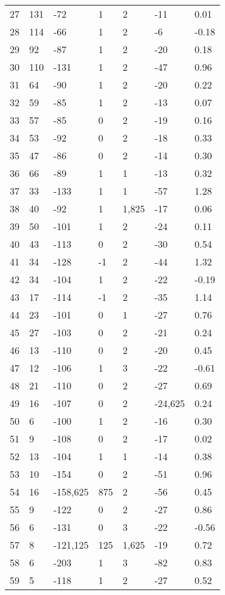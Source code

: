 \begin{appendices}
\begin{longtable}[c]{@{}lllllll@{}}
27 & 131 & -72 & 1 & 2 & -11 & 0.01 \\
28 & 114 & -66 & 1 & 2 & -6 & -0.18 \\
29 & 92 & -87 & 1 & 2 & -20 & 0.18 \\
30 & 110 & -131 & 1 & 2 & -47 & 0.96 \\
31 & 64 & -90 & 1 & 2 & -20 & 0.22 \\
32 & 59 & -85 & 1 & 2 & -13 & 0.07 \\
33 & 57 & -85 & 0 & 2 & -19 & 0.16 \\
34 & 53 & -92 & 0 & 2 & -18 & 0.33 \\
35 & 47 & -86 & 0 & 2 & -14 & 0.30 \\
36 & 66 & -89 & 1 & 1 & -13 & 0.32 \\
37 & 33 & -133 & 1 & 1 & -57 & 1.28 \\
38 & 40 & -92 & 1 & 1,825 & -17 & 0.06 \\
39 & 50 & -101 & 1 & 2 & -24 & 0.11 \\
40 & 43 & -113 & 0 & 2 & -30 & 0.54 \\
41 & 34 & -128 & -1 & 2 & -44 & 1.32 \\
42 & 34 & -104 & 1 & 2 & -22 & -0.19 \\
43 & 17 & -114 & -1 & 2 & -35 & 1.14 \\
44 & 23 & -101 & 0 & 1 & -27 & 0.76 \\
45 & 27 & -103 & 0 & 2 & -21 & 0.24 \\
46 & 13 & -110 & 0 & 2 & -20 & 0.45 \\
47 & 12 & -106 & 1 & 3 & -22 & -0.61 \\
48 & 21 & -110 & 0 & 2 & -27 & 0.69 \\
49 & 16 & -107 & 0 & 2 & -24,625 & 0.24 \\
50 & 6 & -100 & 1 & 2 & -16 & 0.30 \\
51 & 9 & -108 & 0 & 2 & -17 & 0.02 \\
52 & 13 & -104 & 1 & 1 & -14 & 0.38 \\
53 & 10 & -154 & 0 & 2 & -51 & 0.96 \\
54 & 16 & -158,625 & 875 & 2 & -56 & 0.45 \\
55 & 9 & -122 & 0 & 2 & -27 & 0.86 \\
56 & 6 & -131 & 0 & 3 & -22 & -0.56 \\
57 & 8 & -121,125 & 125 & 1,625 & -19 & 0.72 \\
58 & 6 & -203 & 1 & 3 & -82 & 0.83 \\
59 & 5 & -118 & 1 & 2 & -27 & 0.52 \\

\end{longtable}
\end{appendices}
